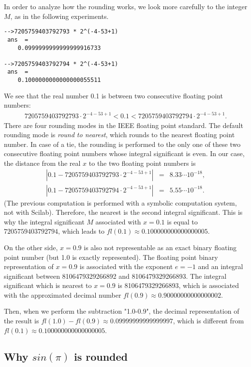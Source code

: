 In order to analyze how the rounding works, we look more carefully to the 
integer $M$, as in the following experiments.
\begin{lstlisting}
-->7205759403792793 * 2^(-4-53+1)
 ans  =
    0.0999999999999999916733  
 
-->7205759403792794 * 2^(-4-53+1)
 ans  =
    0.1000000000000000055511  
\end{lstlisting}
We see that the real number 0.1 is between two consecutive floating point 
numbers:
\begin{eqnarray}
7205759403792793 \cdot 2^{-4-53+1} < 0.1 < 7205759403792794 \cdot 2^{-4-53+1}.
\end{eqnarray}
There are four rounding modes in the IEEE floating point standard. The 
default rounding mode is \emph{round to nearest}, which rounds to the nearest floating 
point number. In case of a tie, the rounding is performed to the only one of these 
two consecutive floating point numbers whose integral significant is even.
In our case, the distance from the real $x$ to the two floating point 
numbers is 
\begin{eqnarray}
|0.1 - 7205759403792793\cdot 2^{-4-53+1}| &=& 8.33\cdots 10^{-18},\\
|0.1 - 7205759403792794\cdot 2^{-4-53+1}| &=& 5.55\cdots 10^{-18}.
\end{eqnarray}
(The previous computation is performed with a symbolic computation system, not with 
Scilab). 
Therefore, the nearest is the second integral significant. This is why the integral 
significant $M$ associated with $x=0.1$ is equal to $7205759403792794$, which leads to 
$fl(0.1)\approx 0.100000000000000005$.

On the other side, $x=0.9$ is also not representable 
as an exact binary floating point number (but 1.0 is exactly represented). 
The floating point binary representation of $x=0.9$ is associated with 
the exponent $e=-1$ and an integral significant between 8106479329266892 and 8106479329266893.
The integral significant which is nearest to $x=0.9$ is 8106479329266893, which is associated with 
the approximated decimal number $fl(0.9)\approx 0.90000000000000002$. 

Then, when we perform the subtraction "1.0-0.9", the decimal representation of the 
result is $fl(1.0)-fl(0.9)\approx 0.09999999999999997$, which is different from 
$fl(0.1)\approx 0.100000000000000005$.

\subsection{Why $sin(\pi)$ is rounded}

